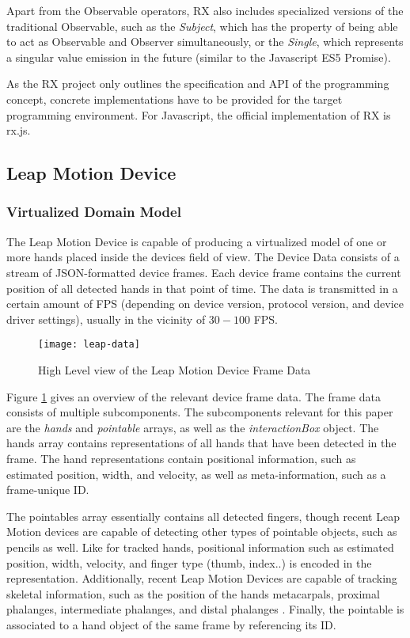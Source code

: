 Apart from the Observable operators, \gls{RX} also includes specialized versions of the traditional Observable, such as the \emph{Subject}, which has the property of being able to act as Observable and Observer simultaneously, or the \emph{Single}, which represents a singular value emission in the future (similar to the Javascript ES5 Promise).

As the \gls{RX} project only outlines the specification and API of the programming concept, concrete implementations have to be provided for the target programming environment. For Javascript, the official implementation of \gls{RX} is rx.js.


\subsection{Leap Motion Device}
\subsubsection{Virtualized Domain Model}
\label{sec:tech:leap-domain-model}
The Leap Motion Device is capable of producing a virtualized model of one or more hands placed inside the devices field of view. The Device Data consists of a stream of JSON-formatted device frames. Each device frame contains the current position of all detected hands in that point of time. The data is transmitted in a certain amount of \gls{FPS} (depending on device version, protocol version, and device driver settings), usually in the vicinity of $30 - 100$ \gls{FPS}.

\begin{figure}[h]
    \centering
    \texttt{[image: leap-data]}
    \caption{High Level view of the Leap Motion Device Frame Data}
    \label{fig:leap-frame-data}
\end{figure}

Figure \ref{fig:leap-frame-data} gives an overview of the relevant device frame data. The frame data consists of multiple subcomponents. The subcomponents relevant for this paper are the \emph{hands} and \emph{pointable} arrays, as well as the \emph{interactionBox} object. The hands array contains representations of all hands that have been detected in the frame. The hand representations contain positional information, such as estimated position, width, and velocity, as well as meta-information, such as a frame-unique ID.

The pointables array essentially contains all detected fingers, though recent Leap Motion devices are capable of detecting other types of pointable objects, such as pencils as well. Like for tracked hands, positional information such as estimated position, width, velocity, and finger type (thumb, index..) is encoded in the representation. Additionally, recent Leap Motion Devices are capable of tracking skeletal information, such as the position of the hands metacarpals, proximal phalanges, intermediate phalanges, and distal phalanges \cite{LeapJsProtocol}. Finally, the pointable is associated to a hand object of the same frame by referencing its ID.

